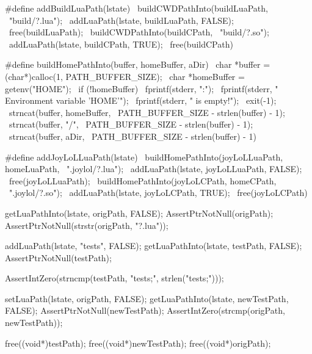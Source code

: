 #define addBuildLuaPath(lstate)            \
  buildCWDPathInto(buildLuaPath,           \
    "build/?.lua");                        \
  addLuaPath(lstate, buildLuaPath, FALSE); \
  free(buildLuaPath);                      \
  buildCWDPathInto(buildCPath,             \
    "build/?.so");                         \
  addLuaPath(lstate, buildCPath, TRUE);    \
  free(buildCPath)
  
#define buildHomePathInto(buffer, homeBuffer, aDir)     \
  char *buffer = (char*)calloc(1, PATH_BUFFER_SIZE);    \
  char *homeBuffer = getenv("HOME");                    \
  if (!homeBuffer) {                                    \
    fprintf(stderr, "\nERROR:\n");                      \
    fprintf(stderr, "  Environment variable 'HOME'\n"); \
    fprintf(stderr, "  is empty!\n\n");                 \
    exit(-1);                                           \
  }                                                     \
  strncat(buffer, homeBuffer,                           \
    PATH_BUFFER_SIZE - strlen(buffer) - 1);             \
  strncat(buffer, "/",                                  \
    PATH_BUFFER_SIZE - strlen(buffer) - 1);             \
  strncat(buffer, aDir,                                 \
    PATH_BUFFER_SIZE - strlen(buffer) - 1)

#define addJoyLoLLuaPath(lstate)                 \
  buildHomePathInto(joyLoLLuaPath, homeLuaPath,  \
    ".joylol/?.lua");                            \
  addLuaPath(lstate, joyLoLLuaPath, FALSE);      \
  free(joyLoLLuaPath);                           \
  buildHomePathInto(joyLoLCPath, homeCPath,      \
    ".joylol/?.so");                             \
  addLuaPath(lstate, joyLoLCPath, TRUE);         \
  free(joyLoLCPath)
\stopCHeader


\startCTest
  getLuaPathInto(lstate, origPath, FALSE);
  AssertPtrNotNull(origPath);
  AssertPtrNotNull(strstr(origPath, "?.lua"));

  addLuaPath(lstate, "tests", FALSE);
  getLuaPathInto(lstate, testPath, FALSE);
  AssertPtrNotNull(testPath);

  AssertIntZero(strncmp(testPath, "tests;", strlen("tests;")));
  
  setLuaPath(lstate, origPath, FALSE);
  getLuaPathInto(lstate, newTestPath, FALSE);
  AssertPtrNotNull(newTestPath);
  AssertIntZero(strcmp(origPath, newTestPath));

  free((void*)testPath);
  free((void*)newTestPath);
  free((void*)origPath);
\stopCTest
\stopTestCase

